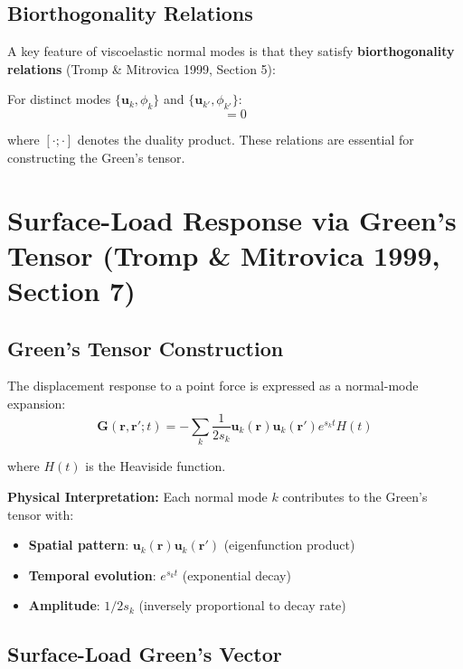 \documentclass{article}
\begin{document}
\subsection{Biorthogonality Relations}

A key feature of viscoelastic normal modes is that they satisfy \textbf{biorthogonality relations} (Tromp \& Mitrovica 1999, Section 5):

For distinct modes $\{\mathbf{u}_k, \phi_k\}$ and $\{\mathbf{u}_{k'}, \phi_{k'}\}$:
\begin{equation}
[\mathbf{u}_k, \phi_k; \{\mathcal{L}(s_k) - \mathcal{L}(s_{k'})\}\mathbf{u}_{k'}, 0] = 0
\end{equation}

where $[\cdot; \cdot]$ denotes the duality product. These relations are essential for constructing the Green's tensor.

\section{Surface-Load Response via Green's Tensor (Tromp \& Mitrovica 1999, Section 7)}

\subsection{Green's Tensor Construction}

The displacement response to a point force is expressed as a normal-mode expansion:
\begin{equation}
\mathbf{G}(\mathbf{r}, \mathbf{r}'; t) = -\sum_k \frac{1}{2s_k} \mathbf{u}_k(\mathbf{r}) \mathbf{u}_k(\mathbf{r}') e^{s_k t} H(t)
\end{equation}

where $H(t)$ is the Heaviside function.

\textbf{Physical Interpretation:} Each normal mode $k$ contributes to the Green's tensor with:
\begin{itemize}
\item \textbf{Spatial pattern}: $\mathbf{u}_k(\mathbf{r}) \mathbf{u}_k(\mathbf{r}')$ (eigenfunction product)
\item \textbf{Temporal evolution}: $e^{s_k t}$ (exponential decay)
\item \textbf{Amplitude}: $1/2s_k$ (inversely proportional to decay rate)
\end{itemize}

\subsection{Surface-Load Green's Vector}
\end{document}
